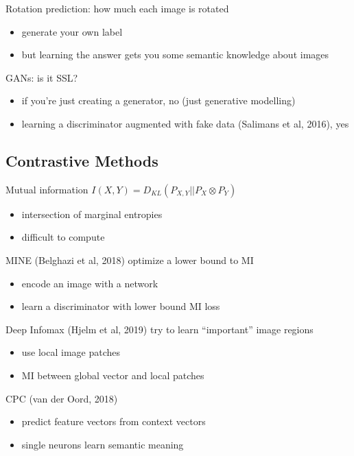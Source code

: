 \documentclass[]{article}
\theoremstyle{definition}
\begin{document}
    Rotation prediction: how much each image is rotated
    \begin{itemize}
        \item generate your own label
        \item but learning the answer gets you some semantic knowledge about images
    \end{itemize}


    GANs: is it SSL?
    \begin{itemize}
        \item if you're just creating a generator, no (just generative modelling)
        \item learning a discriminator augmented with fake data (Salimans et al, 2016), yes
    \end{itemize}

    \subsection{Contrastive Methods}%
    \label{sub:contrastive_methods}

    Mutual information $I(X,Y) = D_{KL}(P_{X,Y} || P_X \otimes P_Y)$
    \begin{itemize}
        \item intersection of marginal entropies
        \item difficult to compute
    \end{itemize}

    MINE (Belghazi et al, 2018) optimize a lower bound to MI
    \begin{itemize}
        \item encode an image with a network
        \item learn a discriminator with lower bound MI loss
    \end{itemize}

    Deep Infomax (Hjelm et al, 2019) try to learn ``important'' image regions
    \begin{itemize}
        \item use local image patches
        \item MI between global vector and local patches
    \end{itemize}

    CPC (van der Oord, 2018)
    \begin{itemize}
        \item predict feature vectors from context vectors
        \item single neurons learn semantic meaning
    \end{itemize}
\end{document}
